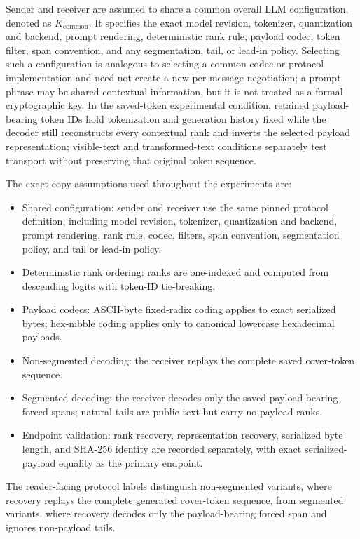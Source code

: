\documentclass[fleqn,10pt]{wlscirep}
\begin{document}
Sender and receiver are assumed to share a common overall LLM configuration, denoted as \(K_{\mathrm{common}}\). It specifies the exact model revision, tokenizer, quantization and backend, prompt rendering, deterministic rank rule, payload codec, token filter, span convention, and any segmentation, tail, or lead-in policy. Selecting such a configuration is analogous to selecting a common codec or protocol implementation and need not create a new per-message negotiation; a prompt phrase may be shared contextual information, but it is not treated as a formal cryptographic key. In the saved-token experimental condition, retained payload-bearing token IDs hold tokenization and generation history fixed while the decoder still reconstructs every contextual rank and inverts the selected payload representation; visible-text and transformed-text conditions separately test transport without preserving that original token sequence.


The exact-copy assumptions used throughout the experiments are:
\begin{itemize}
\item Shared configuration: sender and receiver use the same pinned protocol definition, including model revision, tokenizer, quantization and backend, prompt rendering, rank rule, codec, filters, span convention, segmentation policy, and tail or lead-in policy.
\item Deterministic rank ordering: ranks are one-indexed and computed from descending logits with token-ID tie-breaking.
\item Payload codecs: ASCII-byte fixed-radix coding applies to exact serialized bytes; hex-nibble coding applies only to canonical lowercase hexadecimal payloads.
\item Non-segmented decoding: the receiver replays the complete saved cover-token sequence.
\item Segmented decoding: the receiver decodes only the saved payload-bearing forced spans; natural tails are public text but carry no payload ranks.
\item Endpoint validation: rank recovery, representation recovery, serialized byte length, and SHA-256 identity are recorded separately, with exact serialized-payload equality as the primary endpoint.
\end{itemize}
The reader-facing protocol labels distinguish non-segmented variants, where recovery replays the complete generated cover-token sequence, from segmented variants, where recovery decodes only the payload-bearing forced span and ignores non-payload tails.
\end{document}
